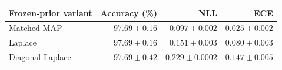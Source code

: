 \begin{tabular}{lrrr}\toprule
Frozen-prior variant & Accuracy (\%) & NLL & ECE \\\midrule
Matched MAP & $97.69\pm 0.16$ & $0.097\pm 0.002$ & $0.025\pm 0.002$\\
Laplace & $97.69\pm 0.16$ & $0.151\pm 0.003$ & $0.080\pm 0.003$\\
Diagonal Laplace & $97.69\pm 0.42$ & $0.229\pm 0.0002$ & $0.147\pm 0.005$\\
\bottomrule\end{tabular}